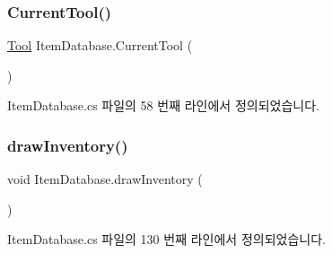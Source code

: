 \subsubsection{\texorpdfstring{CurrentTool()}{CurrentTool()}}
{\footnotesize\ttfamily \mbox{\hyperlink{class_tool}{Tool}} Item\+Database.\+Current\+Tool (\begin{DoxyParamCaption}{ }\end{DoxyParamCaption})}



Item\+Database.\+cs 파일의 58 번째 라인에서 정의되었습니다.


\begin{DoxyCode}{0}

\end{DoxyCode}
\mbox{\label{class_item_database_a587c4dbaea6399d804f3bb0d0ca377df}} 
\subsubsection{\texorpdfstring{drawInventory()}{drawInventory()}}
{\footnotesize\ttfamily void Item\+Database.\+draw\+Inventory (\begin{DoxyParamCaption}{ }\end{DoxyParamCaption})\hspace{0.3cm}{\ttfamily [private]}}



Item\+Database.\+cs 파일의 130 번째 라인에서 정의되었습니다.


